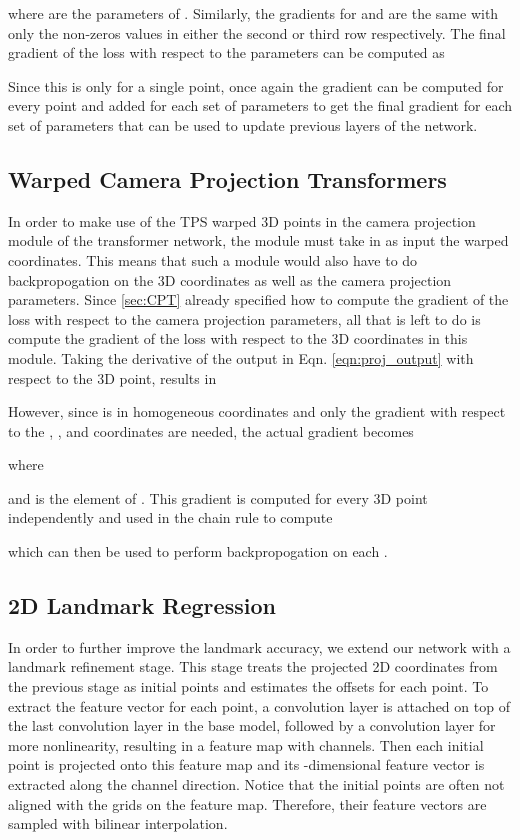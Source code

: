 \documentclass[10pt,twocolumn,letterpaper]{article}
\begin{document}
where  are the parameters of . Similarly, the gradients for  and  are the same with only the non-zeros values in either the second or third row respectively. The final gradient of the loss with respect to the parameters can be computed as

Since this is only for a single point, once again the gradient can be computed for every point and added for each set of parameters to get the final gradient for each set of parameters that can be used to update previous layers of the network.

\subsection{Warped Camera Projection Transformers}
\label{sec:WCPT}
In order to make use of the TPS warped 3D points in the camera projection module of the transformer network, the module must take in as input the warped coordinates. This means that such a module would also have to do backpropogation on the 3D coordinates as well as the camera projection parameters. Since \ref{sec:CPT} already specified how to compute the gradient of the loss with respect to the camera projection parameters, all that is left to do is compute the gradient of the loss with respect to the 3D coordinates in this module.
Taking the derivative of the output in Eqn. \ref{eqn:proj_output} with respect to the 3D point,  results in

However, since  is in homogeneous coordinates and only the gradient with respect to the , , and  coordinates are needed, the actual gradient becomes

where

and  is the  element of . This gradient is computed for every 3D point independently and used in the chain rule to compute

which can then be used to perform backpropogation on each .

\subsection{2D Landmark Regression}
In order to further improve the landmark accuracy, we extend our network with a landmark refinement stage. This stage treats the projected 2D coordinates from the previous stage as initial points and estimates the offsets for each point. To extract the feature vector for each point, a  convolution layer is attached on top of the last convolution layer in the base model, followed by a  convolution layer for more nonlinearity, resulting in a feature map with  channels. Then each initial point is projected onto this feature map and its -dimensional feature vector is extracted along the channel direction. Notice that the initial points are often not aligned with the grids on the feature map. Therefore, their feature vectors are sampled with bilinear interpolation.
\end{document}
